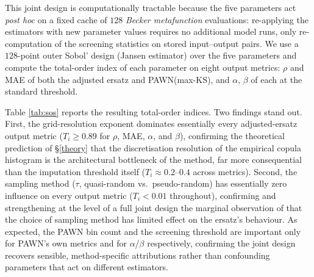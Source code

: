 \documentclass[12pt]{article}
\begin{document}
This joint design is computationally tractable because the five parameters act \emph{post hoc} on a fixed cache of $128$ \textit{Becker metafunction} evaluations: re-applying the estimators with new parameter values requires no additional model runs, only re-computation of the screening statistics on stored input--output pairs. We use a $128$-point outer Sobol' design (Jansen estimator) over the five parameters and compute the total-order index of each parameter on eight output metrics: $\rho$ and MAE of both the adjusted ersatz and PAWN(max-KS), and $\alpha$, $\beta$ of each at the standard threshold.

Table \ref{tab:sos} reports the resulting total-order indices. Two findings stand out. First, the grid-resolution exponent dominates essentially every adjusted-ersatz output metric ($T_i \ge 0.89$ for $\rho$, MAE, $\alpha$, and $\beta$), confirming the theoretical prediction of \S\ref{theory} that the discretisation resolution of the empirical copula histogram is the architectural bottleneck of the method, far more consequential than the imputation threshold itself ($T_i\approx0.2$--$0.4$ across metrics). Second, the sampling method ($\tau$, quasi-random vs.\ pseudo-random) has essentially zero influence on every output metric ($T_i<0.01$ throughout), confirming and strengthening at the level of a full joint design the marginal observation of \citet{puy2024discrepancy} that the choice of sampling method has limited effect on the ersatz's behaviour. As expected, the PAWN bin count and the screening threshold are important only for PAWN's own metrics and for $\alpha$/$\beta$ respectively, confirming the joint design recovers sensible, method-specific attributions rather than confounding parameters that act on different estimators.
\end{document}
